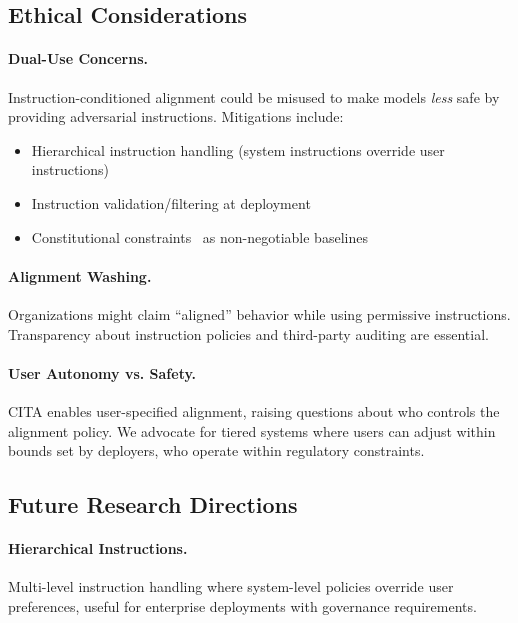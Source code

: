 \vspace{-2mm}
\subsection{Ethical Considerations}
\label{sec:ethics}

\paragraph{Dual-Use Concerns.} Instruction-conditioned alignment could be misused to make models \textit{less} safe by providing adversarial instructions. Mitigations include:
\begin{itemize}[leftmargin=*,itemsep=1pt]
    \item Hierarchical instruction handling (system instructions override user instructions)
    \item Instruction validation/filtering at deployment
    \item Constitutional constraints~\cite{bai2022constitutional} as non-negotiable baselines
\end{itemize}

\paragraph{Alignment Washing.} Organizations might claim ``aligned'' behavior while using permissive instructions. Transparency about instruction policies and third-party auditing are essential.

\paragraph{User Autonomy vs. Safety.} CITA enables user-specified alignment, raising questions about who controls the alignment policy. We advocate for tiered systems where users can adjust within bounds set by deployers, who operate within regulatory constraints.

\vspace{-2mm}
\subsection{Future Research Directions}
\label{sec:future_work}

\paragraph{Hierarchical Instructions.} Multi-level instruction handling where system-level policies override user preferences, useful for enterprise deployments with governance requirements.

